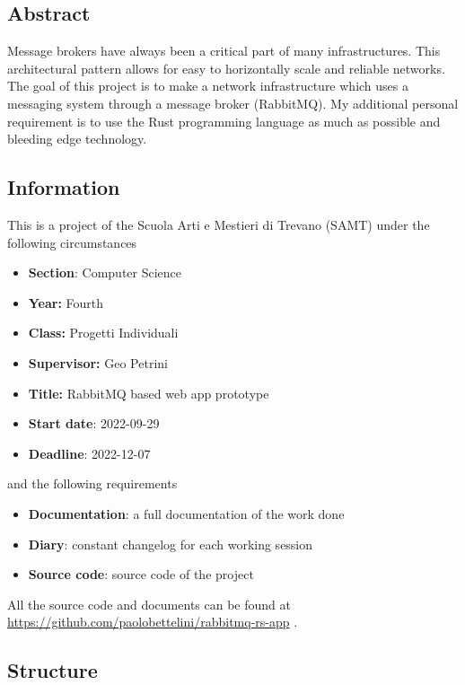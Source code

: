 \documentclass[../documentation.tex]{subfiles}
\begin{document}
\subsection{Abstract}

Message brokers have always been a critical part of many infrastructures.
This architectural pattern allows for easy to horizontally scale and reliable networks.
The goal of this project is to make a network infrastructure
which uses a messaging system through a message broker (RabbitMQ\cite{rabbitmq}).
My additional personal requirement is to use the Rust programming language\cite{rust}
as much as possible and bleeding edge technology.

\subsection{Information}

This is a project of the Scuola Arti e Mestieri di Trevano (SAMT) under the following circumstances

\begin{itemize}
    \item \textbf{Section}: Computer Science
    \item \textbf{Year:} Fourth
    \item \textbf{Class:} Progetti Individuali
    \item \textbf{Supervisor:} Geo Petrini
    \item \textbf{Title:} RabbitMQ based web app prototype
    \item \textbf{Start date}: 2022-09-29
    \item \textbf{Deadline}: 2022-12-07
\end{itemize}

and the following requirements

\begin{itemize}
    \item \textbf{Documentation}: a full documentation of the work done
    \item \textbf{Diary}: constant changelog for each working session
    \item \textbf{Source code}: source code of the project
\end{itemize}

All the source code and documents can be found at
\href{https://github.com/paolobettelini/rabbitmq-rs-app}
{https://github.com/paolobettelini/rabbitmq-rs-app}
\cite{gitrepo}.

\subsection{Structure}
\end{document}
